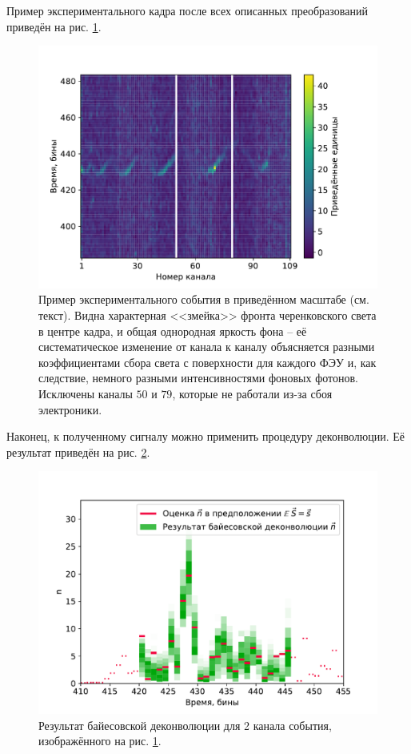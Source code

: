 \documentclass[12pt]{book}
\begin{document}
	Пример экспериментального кадра после всех описанных преобразований приведён на рис. \ref{pic:experimental-frame-example}.

	\begin{figure}
		\centering
		\includegraphics[width=\columnwidth]{experimental-frame-example}
		\caption{Пример экспериментального события в приведённом масштабе (см. текст). Видна характерная <<змейка>> фронта черенковского света в центре кадра, и общая однородная яркость фона -- её систематическое изменение от канала к каналу объясняется разными коэффициентами сбора света с поверхности для каждого ФЭУ и, как следствие, немного разными интенсивностями фоновых фотонов. Исключены каналы $50$ и $79$, которые не работали из-за сбоя электроники.}
		\label{pic:experimental-frame-example}
	\end{figure}

	Наконец, к полученному сигналу можно применить процедуру деконволюции. Её результат приведён на рис. \ref{pic:experimental-signal-deconvolution-example}.

	\begin{figure}
		\centering
		\includegraphics[width=\columnwidth]{experimental-signal-deconvolution-example}
		\caption{Результат байесовской деконволюции для 2 канала события, изображённого на рис. \ref{pic:experimental-frame-example}.}
		\label{pic:experimental-signal-deconvolution-example}
	\end{figure}

	\printbibliography
	
\end{document}
